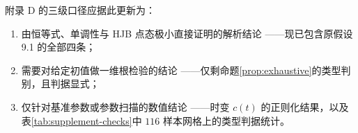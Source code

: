 附录 D 的三级口径应据此更新为：
\begin{enumerate}
\item[(i)] 由恒等式、单调性与 HJB 点态极小直接证明的解析结论
      ——现已包含原假设 9.1 的全部四条；
\item[(ii)] 需要对给定初值做一维根检验的结论
      ——仅剩命题\ref{prop:exhaustive}的类型判别，且判据显式；
\item[(iii)] 仅针对基准参数或参数扫描的数值结论
      ——时变 $c(t)$ 的正则化结果，以及表\ref{tab:supplement-checks}中
      $116$ 样本网格上的类型判据统计。
\end{enumerate}

